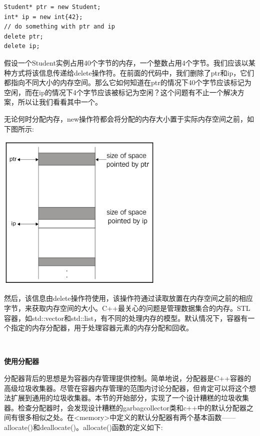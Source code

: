 \begin{lstlisting}[caption={}]
Student* ptr = new Student;
int* ip = new int{42};
// do something with ptr and ip
delete ptr;
delete ip;
\end{lstlisting}

假设一个Student实例占用40个字节的内存，一个整数占用4个字节。我们应该以某种方式将该信息传递给delete操作符。在前面的代码中，我们删除了ptr和ip，它们都指向不同大小的内存空间。那么它如何知道在ptr的情况下40个字节应该标记为空闲，而在ip的情况下4个字节应该被标记为空闲？这个问题有不止一个解决方案，所以让我们看看其中一个。\par
无论何时分配内存，new操作符都会将分配的内存大小置于实际内存空间之前，如下图所示: \par

\begin{center}
	\includegraphics[width=0.6\textwidth]{content/Section-1/Chapter-5/15}
\end{center}

然后，该信息由delete操作符使用，该操作符通过读取放置在内存空间之前的相应字节，来获取内存空间的大小。C++最关心的问题是管理数据集合的内存。STL容器，如std::vector和std::list，有不同的处理内存的模型。默认情况下，容器有一个指定的内存分配器，用于处理容器元素的内存分配和回收。 \par

\noindent\textbf{}\ \par
\textbf{使用分配器} \ \par
分配器背后的思想是为容器内存管理提供控制。简单地说，分配器是C++容器的高级垃圾收集器。尽管在容器内存管理的范围内讨论分配器，但肯定可以将这个想法扩展到通用的垃圾收集器。本节的开始部分，实现了一个设计糟糕的垃圾收集器。检查分配器时，会发现设计糟糕的garbagcollector类和c++中的默认分配器之间有很多相似之处。在<memory>中定义的默认分配器有两个基本函数——allocate()和deallocate()。allocate()函数的定义如下: \par

